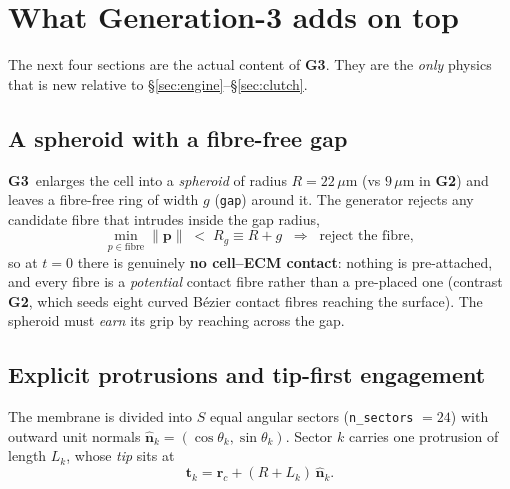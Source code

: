 \documentclass[11pt]{article}
\newcommand{\rv}{\mathbf{r}}
\newcommand{\umt}{\mu\text{m}}            %
\newcommand{\um}{\,\umt}
\newcommand{\GTwo}{\textcolor{g2col}{\textbf{G2}}}
\newcommand{\GThree}{\textcolor{g3col}{\textbf{G3}}}
\newcommand{\code}[1]{\texttt{\small #1}}
\begin{document}
\section{What Generation-3 adds on top}

The next four sections are the actual content of \GThree. They are the \emph{only} physics that is
new relative to \S\ref{sec:engine}--\S\ref{sec:clutch}.

\subsection{A spheroid with a fibre-free gap}
\label{sec:gap}

\GThree\ enlarges the cell into a \emph{spheroid} of radius $R=22\um$ (vs $9\um$ in \GTwo) and leaves a
fibre-free ring of width $g$ (\code{gap}) around it. The generator rejects any candidate fibre
that intrudes inside the gap radius,
\begin{equation}
  \min_{p\in\text{fibre}}\|\mathbf p\| \;<\; R_g \equiv R + g
  \;\;\Longrightarrow\;\; \text{reject the fibre},
  \label{eq:gap}
\end{equation}
so at $t=0$ there is genuinely \textbf{no cell--ECM contact}: nothing is pre-attached, and every
fibre is a \emph{potential} contact fibre rather than a pre-placed one (contrast \GTwo, which seeds
eight curved Bézier contact fibres reaching the surface). The spheroid must \emph{earn} its grip
by reaching across the gap.

\subsection{Explicit protrusions and tip-first engagement}
\label{sec:protrusion}

The membrane is divided into $S$ equal angular sectors (\code{n\_sectors} $=24$) with outward unit
normals $\hat{\mathbf n}_k=(\cos\theta_k,\sin\theta_k)$. Sector $k$ carries one protrusion of
length $L_k$, whose \emph{tip} sits at
\begin{equation}
  \mathbf t_k = \rv_c + (R + L_k)\,\hat{\mathbf n}_k.
  \label{eq:tip}
\end{equation}
\end{document}

